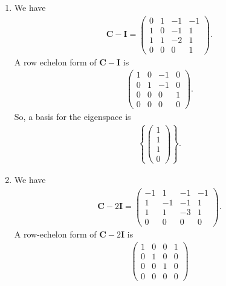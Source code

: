 \documentclass[12pt]{article}
\begin{document}
\begin{enumerate}[label=\textbf{(\alph*)}]
\begin{align*}
\begin{pmatrix}
        \end{pmatrix}\right\}.
    \end{align*}
    \item We have \begin{align*}
        \mathbf{C}-\mathbf{I}=\begin{pmatrix}
            0 & 1 & -1 & -1 \\ 1 & 0 & -1 & 1 \\ 1 & 1 & -2 & 1 \\ 0 & 0 & 0  & 1
        \end{pmatrix}.
    \end{align*}
    A row echelon form of $\mathbf{C}-\mathbf{I}$ is \begin{align*}
        \begin{pmatrix}
            1 & 0 & -1 & 0 \\ 0 & 1 & -1 &0 \\ 0 & 0 & 0 & 1 \\ 0 & 0 & 0 & 0
        \end{pmatrix}.
    \end{align*}
    So, a basis for the eigenspace is \begin{align*}
        \left\{\begin{pmatrix}
            1  \\ 1 \\ 1\\0
        \end{pmatrix}\right\}.
    \end{align*}
    \item We have \begin{align*}
        \mathbf{C}-2\mathbf{I}=\begin{pmatrix}
            -1 & 1 & -1 & -1 \\
            1 & -1 & -1 & 1 \\
            1 & 1 & -3 & 1 \\ 0 & 0 & 0 & 0
        \end{pmatrix}.
    \end{align*}
    A row-echelon form of $\mathbf{C}-2\mathbf{I}$ is \begin{align*}
        \begin{pmatrix}
            1 & 0 & 0 & 1 \\ 0 & 1 & 0 & 0 \\ 0 & 0 & 1 & 0 \\ 0 & 0 & 0 & 0
        \end{pmatrix}
    \end{align*}

\end{enumerate}
\end{document}

